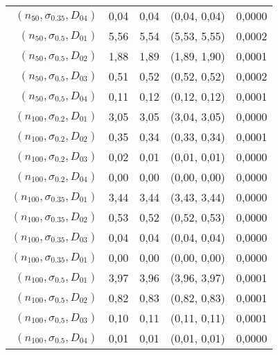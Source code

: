 \documentclass[preprint,12pt]{elsarticle}
\begin{document}
\begin{table}[htbp]
\begin{tabular}{rrrcr}
    $(n_{50},\sigma_{0.35},D_{04})$ & 0,04  & 0,04  & (0,04, 0,04) & 0,0000 \\
    $(n_{50},\sigma_{0.5},D_{01})$ & 5,56  & 5,54  & (5,53, 5,55) & 0,0002 \\
    $(n_{50},\sigma_{0.5},D_{02})$& 1,88  & 1,89  & (1,89, 1,90) & 0,0001 \\
    $(n_{50},\sigma_{0.5},D_{03})$ & 0,51  & 0,52  & (0,52, 0,52) & 0,0002 \\
    $(n_{50},\sigma_{0.5},D_{04})$ & 0,11  & 0,12  & (0,12, 0,12) & 0,0001 \\
   $(n_{100},\sigma_{0.2},D_{01})$ & 3,05  & 3,05  & (3,04, 3,05) & 0,0000 \\
   $(n_{100},\sigma_{0.2},D_{02})$  & 0,35  & 0,34  & (0,33, 0,34) & 0,0001 \\
   $(n_{100},\sigma_{0.2},D_{03})$  & 0,02  & 0,01  & (0,01, 0,01) & 0,0000 \\
   $(n_{100},\sigma_{0.2},D_{04})$  & 0,00  & 0,00  & (0,00, 0,00) & 0,0000 \\
   $(n_{100},\sigma_{0.35},D_{01})$ & 3,44  & 3,44  & (3,43, 3,44) & 0,0000 \\
   $(n_{100},\sigma_{0.35},D_{02})$ & 0,53  & 0,52  & (0,52, 0,53) & 0,0000 \\
   $(n_{100},\sigma_{0.35},D_{03})$& 0,04  & 0,04  & (0,04, 0,04) & 0,0000 \\
   $(n_{100},\sigma_{0.35},D_{01})$ & 0,00  & 0,00  & (0,00, 0,00) & 0,0000 \\
   $(n_{100},\sigma_{0.5},D_{01})$  & 3,97  & 3,96  & (3,96, 3,97) & 0,0001 \\
   $(n_{100},\sigma_{0.5},D_{02})$ & 0,82  & 0,83  & (0,82, 0,83) & 0,0001 \\
   $(n_{100},\sigma_{0.5},D_{03})$ & 0,10  & 0,11  & (0,11, 0,11) & 0,0001 \\
   $(n_{100},\sigma_{0.5},D_{04})$ & 0,01  & 0,01  & (0,01, 0,01) & 0,0000 \\
      \bottomrule
     \end{tabular}%
  \label{lognormal2}%
\end{table}%
\end{document}
